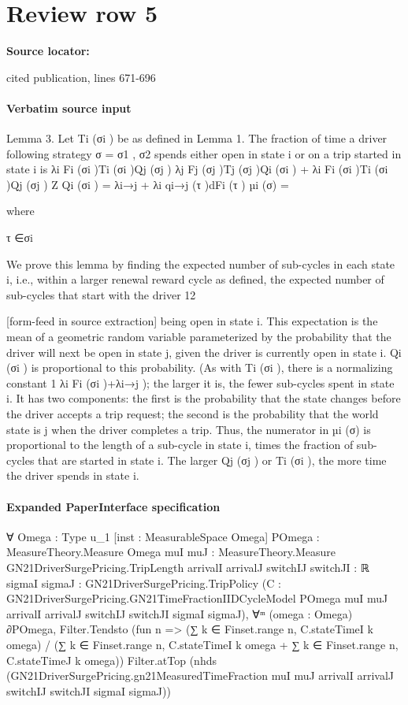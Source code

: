 \documentclass[10pt]{article}
\begin{document}
\section*{Review row 5}
\textbf{Source locator:} {\footnotesize\raggedright cited publication, lines 671-\allowbreak{}696\par}
\paragraph{Verbatim source input}
\begin{ReviewVerbatim}
Lemma 3. Let Ti (σi ) be as defined in Lemma 1. The fraction of time a driver following strategy
σ = {σ1 , σ2 } spends either open in state i or on a trip started in state i is
λi Fi (σi )Ti (σi )Qj (σj )
λj Fj (σj )Tj (σj )Qi (σi ) + λi Fi (σi )Ti (σi )Qj (σj )
Z
Qi (σi ) = λi→j + λi
qi→j (τ )dFi (τ )
µi (σ) =

where

τ ∈σi

We prove this lemma by finding the expected number of sub-cycles in each state i, i.e., within a
larger renewal reward cycle as defined, the expected number of sub-cycles that start with the driver
12


[form-feed in source extraction]
being open in state i. This expectation is the mean of a geometric random variable parameterized
by the probability that the driver will next be open in state j, given the driver is currently open in
state i. Qi (σi ) is proportional to this probability. (As with Ti (σi ), there is a normalizing constant
1
λi Fi (σi )+λi→j ); the larger it is, the fewer sub-cycles spent in state i. It has two components: the
first is the probability that the state changes before the driver accepts a trip request; the second
is the probability that the world state is j when the driver completes a trip. Thus, the numerator
in µi (σ) is proportional to the length of a sub-cycle in state i, times the fraction of sub-cycles that
are started in state i. The larger Qj (σj ) or Ti (σi ), the more time the driver spends in state i.
\end{ReviewVerbatim}


\paragraph{Expanded PaperInterface specification}
\begin{ReviewVerbatim}
∀ {Omega : Type u_1} [inst : MeasurableSpace Omega] {POmega : MeasureTheory.Measure Omega}
  {muI muJ : MeasureTheory.Measure GN21DriverSurgePricing.TripLength} {arrivalI arrivalJ switchIJ switchJI : ℝ}
  {sigmaI sigmaJ : GN21DriverSurgePricing.TripPolicy}
  (C :
    GN21DriverSurgePricing.GN21TimeFractionIIDCycleModel POmega muI muJ arrivalI arrivalJ switchIJ switchJI sigmaI
      sigmaJ),
  ∀ᵐ (omega : Omega) ∂POmega,
    Filter.Tendsto
      (fun n =>
        (∑ k ∈ Finset.range n, C.stateTimeI k omega) /
          (∑ k ∈ Finset.range n, C.stateTimeI k omega + ∑ k ∈ Finset.range n, C.stateTimeJ k omega))
      Filter.atTop
      (nhds (GN21DriverSurgePricing.gn21MeasuredTimeFraction muI muJ arrivalI arrivalJ switchIJ switchJI sigmaI sigmaJ))
\end{ReviewVerbatim}
\end{document}
